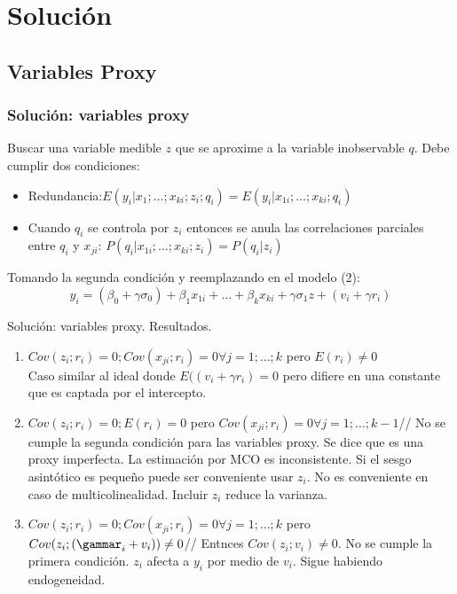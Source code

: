 \documentclass{beamer}
\begin{document}
\section{Soluci\'on}
\subsection{Variables Proxy}
\begin{frame}[fragile]
\frametitle{Soluci\'on: variables proxy}
Buscar una variable medible $z$ que se aproxime a la variable inobservable $q$.
Debe cumplir dos condiciones:
\begin{itemize}
    \item Redundancia:$E(y_i|x_1;\dotsc;x_{ki};z_i;q_i)=E(y_i|x_{1i};\dotsc;x_{ki};q_i)$
    \item Cuando $q_i$ se controla por $z_i$ entonces se anula las correlaciones parciales entre $q_i$ y $x_{ji}$: $P(q_i|x_{1i};\dotsc;x_{ki};z_i)=P(q_i|z_i)$
\end{itemize}
Tomando la segunda condici\'on y reemplazando en el modelo (2):
\begin{equation}
     y_i = (\beta_0+\gamma\sigma_0) + \beta_1 x_{1i}+\dotsc+ \beta_k x_{ki}+\gamma\sigma_1z+(v_i+\gamma r_i)
\end{equation}
\end{frame}

\begin{frame}{Soluci\'on: variables proxy. Resultados.}
\begin{enumerate}
 \item $Cov(z_i;r_i)=0 ; Cov(x_{ji};r_i)=0  \forall j=1;\dotsc;k$ pero $E(r_i) \neq 0$\\
 Caso similar al ideal donde $E((v_i+\gamma r_i)=0$ pero difiere en una constante que es captada por el intercepto.
 \item $Cov(z_i;r_i)=0; E(r_i)=0$ pero $Cov(x_{ji};r_i)=0  \forall j=1;\dotsc;k-1$//
 No se cumple la segunda condici\'on para las variables proxy. Se dice que es una proxy imperfecta. La estimaci\'on por MCO es inconsistente. Si el sesgo asint\'otico es pequeño puede ser conveniente usar $z_i$. No es conveniente en caso de multicolinealidad. Incluir $z_i$ reduce la varianza.
 \item $Cov(z_i;r_i)=0 ; Cov(x_{ji};r_i)=0  \forall j=1;\dotsc;k$ pero $Cov(z_i;(\gammar_i+v_i)) \neq 0$//
 Entnces $Cov(z_i;v_i) \neq 0$. No se cumple la primera condición. $z_i$ afecta a $y_i$ por medio de $v_i$. Sigue habiendo endogeneidad.
\end{enumerate}
    \end{frame}
\end{document}
